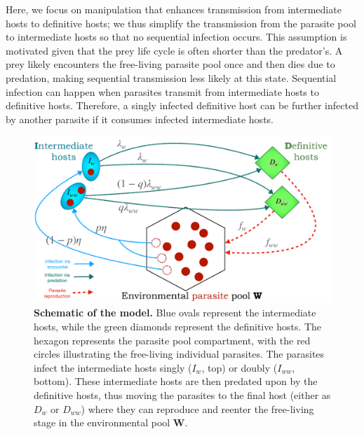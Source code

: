 \documentclass[a4paper]{scrartcl}
\begin{document}
Here, we focus on manipulation that enhances transmission from intermediate hosts to definitive hosts; we thus simplify the transmission from the parasite pool to intermediate hosts so that no sequential infection occurs. 
This assumption is motivated given that the prey life cycle is often shorter than the predator's. 
A prey likely encounters the free-living parasite pool once and then dies due to predation, making sequential transmission less likely at this state.
Sequential infection can happen when parasites transmit from intermediate hosts to definitive hosts. 
Therefore, a singly infected definitive host can be further infected by another parasite if it consumes infected intermediate hosts. 
%
\begin{figure}[ht!]
\captionsetup{format=plain}
\centering
\includegraphics[width=\textwidth]{Figures/schematic.pdf}
\caption{\textbf{Schematic of the model.} 
Blue ovals represent the intermediate hosts, while the green diamonds represent the definitive hosts.
The hexagon represents the parasite pool compartment, with the red circles illustrating the free-living individual parasites.
The parasites infect the intermediate hosts singly ($I_w$, top) or doubly ($I_{ww}$, bottom).
These intermediate hosts are then predated upon by the definitive hosts, thus moving the parasites to the final host (either as $D_w$ or $D_{ww}$) where they can reproduce and reenter the free-living stage in the environmental pool $\mathbf{W}$.
}
\label{fig:schematic}
\end{figure}
\end{document}
